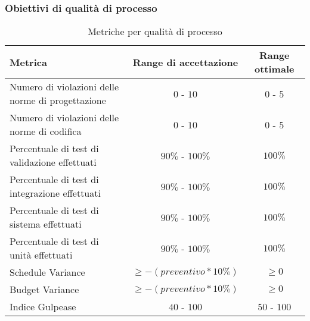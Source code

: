 \documentclass[../PianoDiQualifica.tex]{subfiles}
\begin{document}
			\subsubsection{Obiettivi di qualità di processo}\label{sez:MetrichePerQualitaDiProcesso}
				\normalsize
				\begin{table}[H]
				\center
					\begin{tabular}{|p{6.5cm}|c|c|}
						\hline
						\rowcolor{blue!30}\textbf{Metrica} & \textbf{Range di accettazione} & \textbf{Range ottimale} \\ \hline
						Numero di violazioni delle norme di progettazione & $0$ - $10$ & $0$ - $5$\\ \hline
						Numero di violazioni delle norme di codifica & $0$ - $10$ & $0$ - $5$\\ \hline
						Percentuale di test di validazione effettuati & $90\%$ - $100\%$ & $100\%$\\ \hline
						Percentuale di test di integrazione effettuati & $90\%$ - $100\%$ & $100\%$\\ \hline
						Percentuale di test di sistema effettuati & $90\%$ - $100\%$ & $100\%$\\ \hline
						Percentuale di test di unità effettuati & $90\%$ - $100\%$ & $100\%$\\ \hline
						Schedule Variance & $\geq -(preventivo*10\%)$ & $\geq 0$ \\ \hline
						Budget Variance & $\geq -(preventivo*10\%)$ & $\geq 0$ \\ \hline
						Indice Gulpease & $40$ - $100$ & $50$ - $100$ \\ \hline
					\end{tabular}
					\caption{Metriche per qualità di processo}
				\end{table}
\end{document}
